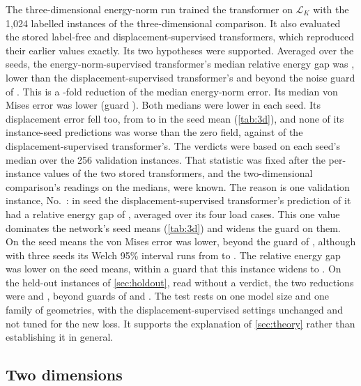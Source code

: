 The three-dimensional energy-norm run trained the transformer on $\mathcal{L}_K$ with the
1,024 labelled instances of the three-dimensional comparison. It also evaluated the stored label-free and
displacement-supervised transformers, which reproduced their earlier values exactly. Its two hypotheses were supported. Averaged over the seeds, the
energy-norm-supervised transformer's median relative energy gap was \numKdKnormGapMedian{},
\numKdGapRel{} lower than the displacement-supervised transformer's \numKdLabGapMedian{} and
beyond the noise guard of \numKdGapTau{}. This is a \numNlThreeNormE{}-fold reduction of the
median energy-norm error. Its median von Mises error was \numKdVmRel{} lower (guard \numKdVmTau{}).
Both medians were lower in each seed. Its displacement error fell too, from
\numThreeLabDisp{} to \numThreeKnormDisp{} in the seed mean (\cref{tab:3d}), and none of its
\numThreePairs{} instance-seed predictions was worse than the zero field, against
\numThreeLabWorse{} of the displacement-supervised transformer's. The verdicts were based on each seed's median over the 256 validation instances. That statistic was
fixed after the per-instance values of the two stored transformers, and the two-dimensional comparison's readings on the
medians, were known. The reason is one validation instance, No.~\numWorstIndex{}: in seed
\numThreeLabWorstSeed{} the displacement-supervised transformer's prediction of it had a
relative energy gap of \numThreeLabWorst{}, averaged over its four load cases. This one value dominates the network's seed means
(\cref{tab:3d}) and widens the guard on them. On the seed means
the von Mises error was \numKdMeansVmRel{} lower, beyond the guard of \numKdMeansVmTau{},
although with three seeds its Welch 95\% interval runs from \numKdMeansVmWelchLow{} to \numKdMeansVmWelchHigh{}. The relative energy gap was
\numKdMeansGapRel{} lower on the seed means, within a guard that this instance widens to \numKdMeansGapTau{}. On the \numHoldThreeN{} held-out
instances of \cref{sec:holdout}, read without a verdict, the two reductions were
\numKdHoldGapRel{} and \numKdHoldVmRel{}, beyond guards of \numKdHoldGapTau{} and
\numKdHoldVmTau{}. The test rests on one model size and one family of geometries, with the
displacement-supervised settings unchanged and not tuned for the new loss. It supports the explanation of \cref{sec:theory} rather than establishing it in general.

\subsection{Two dimensions}\label{sec:norm:two}

